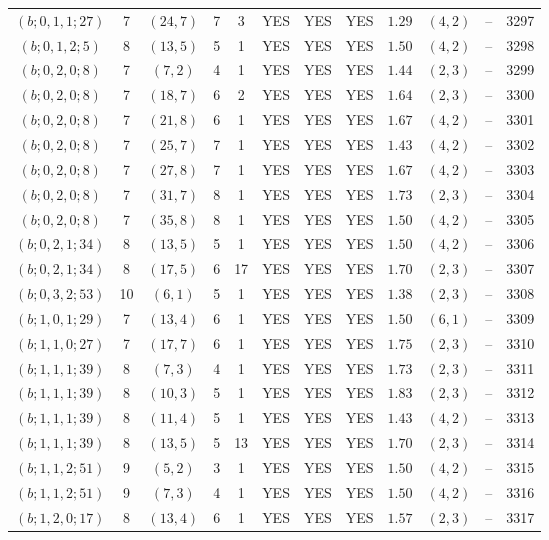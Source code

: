 \begin{longtable}{|c|c|c|c|c|c|c|c|c|c|c|c|}
$(b;0,1,1;27)$ & 7 & $(24,7)$ & 7 & 3 & YES & YES & YES & $1.29$ & $(4,2)$ & -- & 3297\\
$(b;0,1,2;5)$ & 8 & $(13,5)$ & 5 & 1 & YES & YES & YES & $1.50$ & $(4,2)$ & -- & 3298\\
$(b;0,2,0;8)$ & 7 & $(7,2)$ & 4 & 1 & YES & YES & YES & $1.44$ & $(2,3)$ & -- & 3299\\
$(b;0,2,0;8)$ & 7 & $(18,7)$ & 6 & 2 & YES & YES & YES & $1.64$ & $(2,3)$ & -- & 3300\\
$(b;0,2,0;8)$ & 7 & $(21,8)$ & 6 & 1 & YES & YES & YES & $1.67$ & $(4,2)$ & -- & 3301\\
$(b;0,2,0;8)$ & 7 & $(25,7)$ & 7 & 1 & YES & YES & YES & $1.43$ & $(4,2)$ & -- & 3302\\
$(b;0,2,0;8)$ & 7 & $(27,8)$ & 7 & 1 & YES & YES & YES & $1.67$ & $(4,2)$ & -- & 3303\\
$(b;0,2,0;8)$ & 7 & $(31,7)$ & 8 & 1 & YES & YES & YES & $1.73$ & $(2,3)$ & -- & 3304\\
$(b;0,2,0;8)$ & 7 & $(35,8)$ & 8 & 1 & YES & YES & YES & $1.50$ & $(4,2)$ & -- & 3305\\
$(b;0,2,1;34)$ & 8 & $(13,5)$ & 5 & 1 & YES & YES & YES & $1.50$ & $(4,2)$ & -- & 3306\\
$(b;0,2,1;34)$ & 8 & $(17,5)$ & 6 & 17 & YES & YES & YES & $1.70$ & $(2,3)$ & -- & 3307\\
$(b;0,3,2;53)$ & 10 & $(6,1)$ & 5 & 1 & YES & YES & YES & $1.38$ & $(2,3)$ & -- & 3308\\
$(b;1,0,1;29)$ & 7 & $(13,4)$ & 6 & 1 & YES & YES & YES & $1.50$ & $(6,1)$ & -- & 3309\\
$(b;1,1,0;27)$ & 7 & $(17,7)$ & 6 & 1 & YES & YES & YES & $1.75$ & $(2,3)$ & -- & 3310\\
$(b;1,1,1;39)$ & 8 & $(7,3)$ & 4 & 1 & YES & YES & YES & $1.73$ & $(2,3)$ & -- & 3311\\
$(b;1,1,1;39)$ & 8 & $(10,3)$ & 5 & 1 & YES & YES & YES & $1.83$ & $(2,3)$ & -- & 3312\\
$(b;1,1,1;39)$ & 8 & $(11,4)$ & 5 & 1 & YES & YES & YES & $1.43$ & $(4,2)$ & -- & 3313\\
$(b;1,1,1;39)$ & 8 & $(13,5)$ & 5 & 13 & YES & YES & YES & $1.70$ & $(2,3)$ & -- & 3314\\
$(b;1,1,2;51)$ & 9 & $(5,2)$ & 3 & 1 & YES & YES & YES & $1.50$ & $(4,2)$ & -- & 3315\\
$(b;1,1,2;51)$ & 9 & $(7,3)$ & 4 & 1 & YES & YES & YES & $1.50$ & $(4,2)$ & -- & 3316\\
$(b;1,2,0;17)$ & 8 & $(13,4)$ & 6 & 1 & YES & YES & YES & $1.57$ & $(2,3)$ & -- & 3317\\

\end{longtable}

